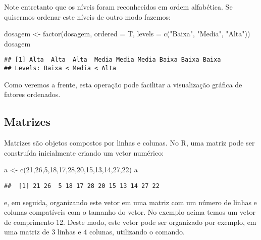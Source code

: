 \documentclass[
]{book}
\newenvironment{Shaded}{\begin{snugshade}}{\end{snugshade}}
\newcommand{\AttributeTok}[1]{\textcolor[rgb]{0.77,0.63,0.00}{#1}}
\newcommand{\DecValTok}[1]{\textcolor[rgb]{0.00,0.00,0.81}{#1}}
\newcommand{\FunctionTok}[1]{\textcolor[rgb]{0.00,0.00,0.00}{#1}}
\newcommand{\NormalTok}[1]{#1}
\newcommand{\OtherTok}[1]{\textcolor[rgb]{0.56,0.35,0.01}{#1}}
\newcommand{\StringTok}[1]{\textcolor[rgb]{0.31,0.60,0.02}{#1}}
\begin{document}
Note entretanto que os níveis foram reconhecidos em ordem alfabética. Se quisermos ordenar este níveis de outro modo fazemos:

\begin{Shaded}
\begin{Highlighting}[]
\NormalTok{dosagem }\OtherTok{\textless{}{-}} \FunctionTok{factor}\NormalTok{(dosagem, }\AttributeTok{ordered =}\NormalTok{ T, }
                 \AttributeTok{levels =} \FunctionTok{c}\NormalTok{(}\StringTok{"Baixa"}\NormalTok{, }\StringTok{"Media"}\NormalTok{, }\StringTok{"Alta"}\NormalTok{))}
\NormalTok{dosagem}
\end{Highlighting}
\end{Shaded}

\begin{verbatim}
## [1] Alta  Alta  Alta  Media Media Media Baixa Baixa Baixa
## Levels: Baixa < Media < Alta
\end{verbatim}

Como veremos a frente, esta operação pode facilitar a visualização gráfica de fatores ordenados.

\hypertarget{matrizes}{%
\subsection{Matrizes}\label{matrizes}}

Matrizes são objetos compostos por linhas e colunas. No R, uma matriz pode ser construída inicialmente criando um vetor numérico:

\begin{Shaded}
\begin{Highlighting}[]
\NormalTok{a }\OtherTok{\textless{}{-}} \FunctionTok{c}\NormalTok{(}\DecValTok{21}\NormalTok{,}\DecValTok{26}\NormalTok{,}\DecValTok{5}\NormalTok{,}\DecValTok{18}\NormalTok{,}\DecValTok{17}\NormalTok{,}\DecValTok{28}\NormalTok{,}\DecValTok{20}\NormalTok{,}\DecValTok{15}\NormalTok{,}\DecValTok{13}\NormalTok{,}\DecValTok{14}\NormalTok{,}\DecValTok{27}\NormalTok{,}\DecValTok{22}\NormalTok{)}
\NormalTok{a}
\end{Highlighting}
\end{Shaded}

\begin{verbatim}
##  [1] 21 26  5 18 17 28 20 15 13 14 27 22
\end{verbatim}

e, em seguida, organizando este vetor em uma matriz com um número de linhas e colunas compatíveis com o tamanho do vetor. No exemplo acima temos um vetor de comprimento 12. Deste modo, este vetor pode ser organizado por exemplo, em uma matriz de \(3\) linhas e \(4\) colunas, utilizando o comando.
\end{document}
